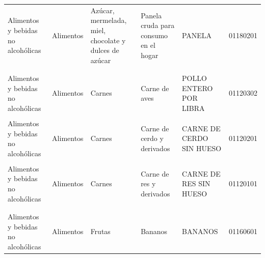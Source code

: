 \begin{longtable}[t]{lllllc}
\hspace{1em}Alimentos y bebidas no alcohólicas & Alimentos & Azúcar, mermelada, miel, chocolate y dulces de azúcar & Panela cruda para consumo en el hogar & PANELA & 01180201\\
\addlinespace[0.5em]
\multicolumn{6}{l}{\textbf{Carnes}}\\
\hspace{1em}\cellcolor{gray!10}{Alimentos y bebidas no alcohólicas} & \cellcolor{gray!10}{Alimentos} & \cellcolor{gray!10}{Carnes} & \cellcolor{gray!10}{Carne de aves} & \cellcolor{gray!10}{POLLO DESPRESADO POR LIBRA} & \cellcolor{gray!10}{01120301}\\
\hspace{1em}Alimentos y bebidas no alcohólicas & Alimentos & Carnes & Carne de aves & POLLO ENTERO POR LIBRA & 01120302\\
\hspace{1em}\cellcolor{gray!10}{Alimentos y bebidas no alcohólicas} & \cellcolor{gray!10}{Alimentos} & \cellcolor{gray!10}{Carnes} & \cellcolor{gray!10}{Carne de cerdo y derivados} & \cellcolor{gray!10}{CARNE DE CERDO CON HUESO} & \cellcolor{gray!10}{01120202}\\
\hspace{1em}Alimentos y bebidas no alcohólicas & Alimentos & Carnes & Carne de cerdo y derivados & CARNE DE CERDO SIN HUESO & 01120201\\
\hspace{1em}\cellcolor{gray!10}{Alimentos y bebidas no alcohólicas} & \cellcolor{gray!10}{Alimentos} & \cellcolor{gray!10}{Carnes} & \cellcolor{gray!10}{Carne de res y derivados} & \cellcolor{gray!10}{CARNE DE RES CON HUESO} & \cellcolor{gray!10}{01120102}\\
\hspace{1em}Alimentos y bebidas no alcohólicas & Alimentos & Carnes & Carne de res y derivados & CARNE DE RES SIN HUESO & 01120101\\
\hspace{1em}\cellcolor{gray!10}{Alimentos y bebidas no alcohólicas} & \cellcolor{gray!10}{Alimentos} & \cellcolor{gray!10}{Carnes} & \cellcolor{gray!10}{Carne de res y derivados} & \cellcolor{gray!10}{VISCERAS - HIGADO} & \cellcolor{gray!10}{01120104}\\
\addlinespace[0.5em]
\multicolumn{6}{l}{\textbf{Frutas}}\\
\hspace{1em}Alimentos y bebidas no alcohólicas & Alimentos & Frutas & Bananos & BANANOS & 01160601\\

\end{longtable}
